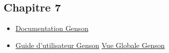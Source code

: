 \documentclass{article}[12pt]
\begin{document}
\subsection{Chapitre 7}
\begin{itemize}
	\item \href{http://owlike.github.io/genson/}{Documentation Genson}
    \item \href{http://owlike.github.io/genson/Documentation/UserGuide/}{Guide d'utilisateur Genson}
    \href{http://owlike.github.io/genson/Documentation/Javadoc/}{Vue Globale Genson}
\end{itemize}
\end{document}
